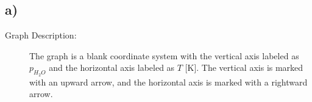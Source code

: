 

\subsection*{a)}

\begin{description}
    \item[Graph Description:] The graph is a blank coordinate system with the vertical axis labeled as $p_{H_2O}$ and the horizontal axis labeled as $T$ [K]. The vertical axis is marked with an upward arrow, and the horizontal axis is marked with a rightward arrow.
\end{description}